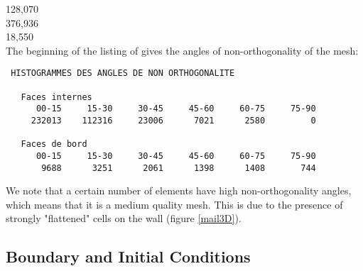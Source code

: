  128,070 \\
 376,936 \\
 18,550 \\

\noindent 
The beginning of the listing of \CS gives the angles of non-orthogonality of the mesh:
\scriptsize
\begin{verbatim}
 HISTOGRAMMES DES ANGLES DE NON ORTHOGONALITE

   Faces internes
      00-15     15-30     30-45     45-60     60-75     75-90
     232013    112316     23006      7021      2580         0

   Faces de bord
      00-15     15-30     30-45     45-60     60-75     75-90
       9688      3251      2061      1398      1408       744
\end{verbatim}
\normalsize
We note that a certain number of elements have high non-orthogonality angles, which means that it is a medium quality mesh. This is due to the presence of strongly "flattened" cells
on the wall (figure \ref{mail3D}).

\subsection{Boundary and Initial Conditions}


